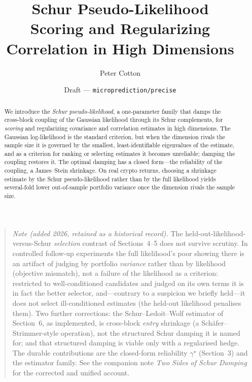 \documentclass[11pt]{article}
\title{\vspace{-2em}Schur Pseudo-Likelihood\\[0.3em]
       \large Scoring and Regularizing Correlation in High Dimensions}
\author{Peter Cotton}
\date{Draft --- \texttt{microprediction/precise}}
\begin{document}
\maketitle

\begin{abstract}
\noindent
We introduce the \emph{Schur pseudo-likelihood}, a one-parameter family that damps the cross-block
coupling of the Gaussian likelihood through its Schur complements, for \emph{scoring} and regularizing
covariance and correlation estimates in high dimensions. The Gaussian log-likelihood is the standard
criterion, but when the dimension rivals the sample size it is governed by the smallest,
least-identifiable eigenvalues of the estimate, and as a criterion for ranking or selecting estimates
it becomes unreliable; damping the coupling restores it. The optimal damping has a closed
form---the reliability of the coupling, a James--Stein shrinkage. On real crypto returns, choosing a
shrinkage estimate by the Schur pseudo-likelihood rather than by the full likelihood yields several-fold
lower out-of-sample portfolio variance once the dimension rivals the sample size.
\end{abstract}

\begin{quote}\small\emph{Note (added 2026, retained as a historical record).} The held-out-likelihood-versus-Schur
\emph{selection} contrast of Sections~4--5 does not survive scrutiny. In controlled follow-up
experiments the full likelihood's poor showing there is an artifact of judging by portfolio
\emph{variance} rather than by likelihood (objective mismatch), not a failure of the likelihood as a
criterion: restricted to well-conditioned candidates and judged on its own terms it is in fact the
better selector, and---contrary to a suspicion we briefly held---it does not select ill-conditioned
estimates (the held-out likelihood penalises them). Two further corrections: the Schur--Ledoit--Wolf
estimator of Section~6, as implemented, is cross-block \emph{entry} shrinkage (a Sch\"afer--Strimmer-style
operation), not the structured Schur damping it is named for; and that structured damping is viable only
with a regularised hedge. The durable contributions are the closed-form reliability $\gamma^\star$
(Section~3) and the estimator family. See the companion note \emph{Two Sides of Schur Damping} for the
corrected and unified account.\end{quote}
\end{document}

